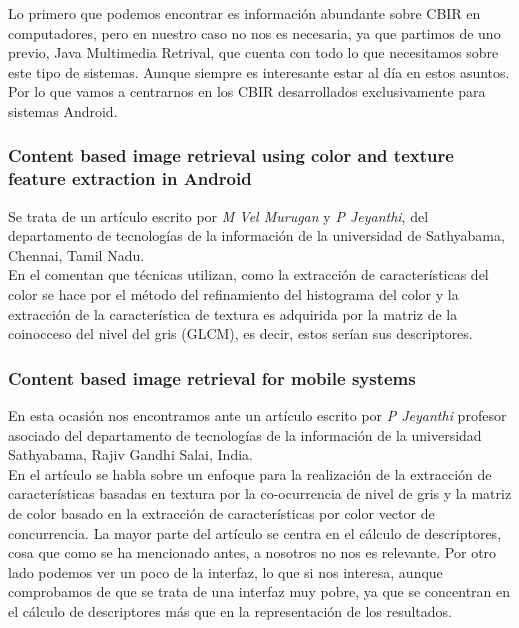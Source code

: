 Lo primero que podemos encontrar es información abundante sobre CBIR en computadores, pero en nuestro caso no nos es necesaria, ya que partimos de uno previo, Java Multimedia Retrival, que cuenta con todo lo que necesitamos sobre este tipo de sistemas. Aunque siempre es interesante estar al día en estos asuntos.\\

Por lo que vamos a centrarnos en los CBIR desarrollados exclusivamente para sistemas Android.

\subsubsection{Content based image retrieval using color and texture feature extraction in Android}

Se trata de un artículo escrito por \textit{M Vel Murugan} y \textit{P Jeyanthi}, del departamento de tecnologías de la información de la universidad de Sathyabama, Chennai, Tamil Nadu.\\

En el comentan que técnicas utilizan, como la extracción de características del color se hace por el método del refinamiento del histograma del color y la extracción de la característica de textura es adquirida por la matriz de la coinocceso del nivel del gris (GLCM), es decir, estos serían sus descriptores.


\subsubsection{Content based image retrieval for mobile systems}

En esta ocasión nos encontramos ante un artículo escrito por \textit{P Jeyanthi} profesor asociado del departamento de tecnologías de la información de la universidad Sathyabama, Rajiv Gandhi Salai, India.\\

En el artículo se habla sobre un enfoque para la realización de la extracción de características basadas en textura por la co-ocurrencia de nivel de gris y la matriz de color basado en la extracción de características por color vector de concurrencia. La mayor parte del artículo se centra en el cálculo de descriptores, cosa que como se ha mencionado antes, a nosotros no nos es relevante. Por otro lado podemos ver un poco de la interfaz, lo que si nos interesa, aunque comprobamos de que se trata de una interfaz muy pobre, ya que se concentran en el cálculo de descriptores más que en la representación de los resultados.


